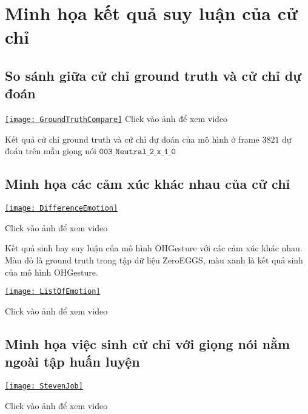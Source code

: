 \chapter{Minh họa kết quả suy luận của cử chỉ}
\label{Appendix3}

\section{So sánh giữa cử chỉ ground truth và cử chỉ dự đoán}


\begin{center}
\centering
\href{https://youtu.be/22lNm2tvmrk}{%
\texttt{[image: GroundTruthCompare]}}
{\tiny Click vào ảnh để xem video}
\end{center}

Kết quả cử chỉ ground truth và cử chỉ dự đoán của mô hình ở frame $3821$ dự đoán trên mẫu giọng nói $\texttt{003\_Neutral\_2\_x\_1\_0}$

\section{Minh họa các cảm xúc khác nhau của cử chỉ}

{
	\begin{center}
		\centering
		\href{https://youtu.be/KUlBZXLtYJ4}{%
			\texttt{[image: DifferenceEmotion]}}
		
		{\tiny Click vào ảnh để xem video}
	\end{center}
}

Kết quả sinh hay suy luận của mô hình OHGesture với các cảm xúc khác nhau. Màu đỏ là ground truth trong tập dữ liệu ZeroEGGS, màu xanh là kết quả sinh của mô hình OHGesture.

{
	\begin{center}
		\centering
		\href{https://youtu.be/eZghfNGmZn8}{%
			\texttt{[image: ListOfEmotion]}}
		
		{\tiny Click vào ảnh để xem video}
	\end{center}
}

\section{Minh họa việc sinh cử chỉ với giọng nói nằm ngoài tập huấn luyện}

{
	\begin{center}
		\centering
		\href{https://www.youtube.com/watch?v=B6nv1kQmi-Q}{%
		\texttt{[image: StevenJob]}}
		
		{\tiny Click vào ảnh để xem video}
	\end{center}
}

